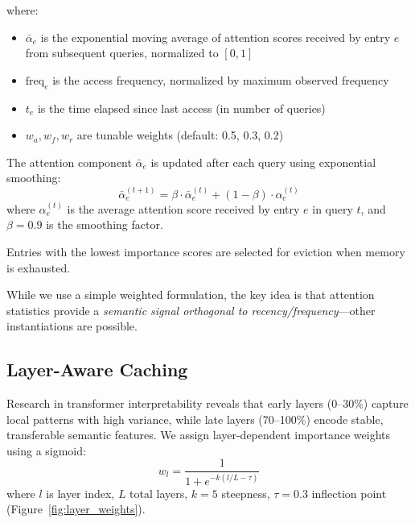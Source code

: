 \documentclass{article}
\begin{document}
where:
\begin{itemize}
    \item $\bar{\alpha}_e$ is the exponential moving average of attention scores received by entry $e$ from subsequent queries, normalized to $[0, 1]$
    \item $\text{freq}_e$ is the access frequency, normalized by maximum observed frequency
    \item $t_e$ is the time elapsed since last access (in number of queries)
    \item $w_a, w_f, w_r$ are tunable weights (default: 0.5, 0.3, 0.2)
\end{itemize}

The attention component $\bar{\alpha}_e$ is updated after each query using exponential smoothing:
\begin{equation}
    \bar{\alpha}_e^{(t+1)} = \beta \cdot \bar{\alpha}_e^{(t)} + (1-\beta) \cdot \alpha_e^{(t)}
\end{equation}
where $\alpha_e^{(t)}$ is the average attention score received by entry $e$ in query $t$, and $\beta = 0.9$ is the smoothing factor.

Entries with the lowest importance scores are selected for eviction when memory is exhausted.

While we use a simple weighted formulation, the key idea is that attention statistics provide a \emph{semantic signal orthogonal to recency/frequency}---other instantiations are possible.

\subsection{Layer-Aware Caching}

Research in transformer interpretability \citep{rogers2020primer,elhage2021mathematical} reveals that early layers (0--30\%) capture local patterns with high variance, while late layers (70--100\%) encode stable, transferable semantic features.
We assign layer-dependent importance weights using a sigmoid:
\begin{equation}
    w_l = \frac{1}{1 + e^{-k(l/L - \tau)}}
    \label{eq:layer_weight}
\end{equation}
where $l$ is layer index, $L$ total layers, $k{=}5$ steepness, $\tau{=}0.3$ inflection point (Figure~\ref{fig:layer_weights}).
\end{document}
